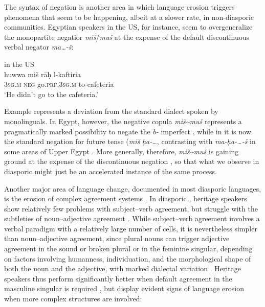 \documentclass[output=paper]{langsci/langscibook}
\begin{document}
The syntax of {negation} is another area in which {language erosion} triggers phenomena that seem to be happening, albeit at a slower rate, in non-diasporic communities. Egyptian speakers in the US, for instance, seem to overgeneralize the monopartite negatior \textit{miš}\slash\textit{muš} at the expense of the default discontinuous verbal negator \textit{ma…-š}: 

\ea\label{danna:egy}
{ in the US \citep[482]{AlbiriniBenmamoun2015}}\\
\gll huwwa miš rāḥ l-kaftiria\\
     \textsc{3sg.m} \textsc{neg} go.\textsc{prf.3sg.m} to-cafeteria\\
\glt `He didn’t go to the cafeteria.'
\z

Example  represents a deviation from the standard  dialect spoken by monolinguals. In Egypt, however, the negative {copula} \textit{miš{\textasciitilde}muš} represents a pragmatically marked possibility to negate the \textit{b-} imperfect \citep[302]{Brustad2000}, while in  it is now the standard {negation} for {future} {tense} (\textit{miš} \textit{ḥa-…}, contrasting with \textit{ma-ḥa-…-š} in some areas of Upper Egypt \citep[285]{Brustad2000}. More generally, therefore,  \textit{miš{\textasciitilde}muš} is gaining ground at the expense of the discontinuous {negation} \citep[285]{Brustad2000}, so that what we observe in diasporic  might just be an accelerated instance of the same process.

Another major area of {language change}, documented in most diasporic languages, is the erosion of complex {agreement} systems \citep[192]{GonzoSaltarelli1983}. In diasporic , {heritage speakers} show relatively few problems with subject–verb {agreement}, but struggle with the subtleties of noun–adjective {agreement} \citep[8]{AlbiriniChakrani2013}. While subject--verb {agreement} involves a verbal paradigm with a relatively large number of cells, it is nevertheless simpler than noun–adjective {agreement}, since plural nouns can trigger adjective {agreement} in the sound or {broken plural} or in the feminine singular, depending on factors involving humanness, individuation, and the morphological shape of both the noun and the adjective, with marked dialectal variation \citep[103–104]{Danna2017article}. Heritage speakers thus perform significantly better when default {agreement} in the masculine singular is required \citep[8]{AlbiriniChakrani2013}, but display evident signs of {language erosion} when more complex structures are involved:\largerpage
\end{document}
